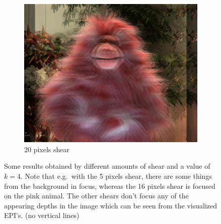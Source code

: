 \documentclass[a4paper]{article}
\begin{document}
\begin{figure}[ht]
\begin{subfigure}[h]{0.48\textwidth}
	  \vspace{2mm}
	  \includegraphics[width=\textwidth]{ShearedInterpolation58_62_shear20}
	  \caption*{20 pixels shear}
	\end{subfigure}
\caption{Some results obtained by different amounts of shear and a value of $k=4$. Note that e.g.\ with the 5 pixels shear, there are some things from the background in focus, whereas the 16 pixels shear is focused on the pink animal. The other shears don't focus any of the appearing depths in the image which can be seen from the visualized EPI's. (no vertical lines)}
\label{fig:shearedInterpolationDifferentShear}
\end{figure}
\end{document}
